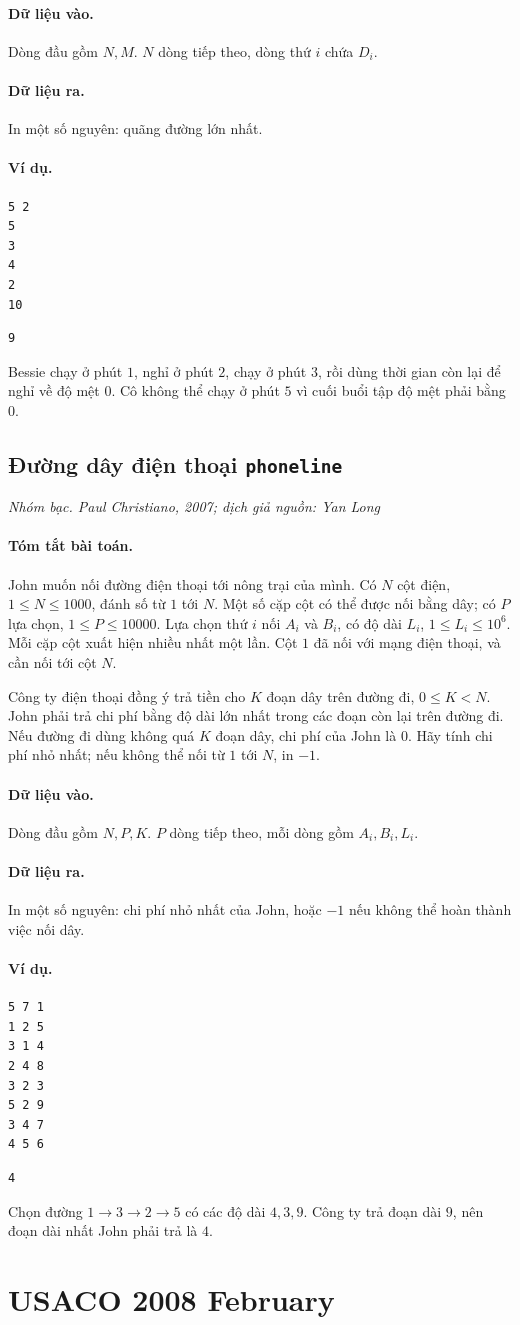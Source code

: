 \documentclass[11pt]{article}
\newcommand{\problem}[4]{%
  \subsection[#1 (#2)]{#1 \hfill {\normalsize\texttt{#2}}}%
  \noindent\textit{#3. #4}\par\smallskip
}
\newcommand{\iosec}[1]{\paragraph{#1}}
\begin{document}
\iosec{Dữ liệu vào.}
Dòng đầu gồm \(N,M\). \(N\) dòng tiếp theo, dòng thứ \(i\) chứa \(D_i\).

\iosec{Dữ liệu ra.}
In một số nguyên: quãng đường lớn nhất.

\iosec{Ví dụ.}
\begin{verbatim}
5 2
5
3
4
2
10
\end{verbatim}

\begin{verbatim}
9
\end{verbatim}

Bessie chạy ở phút \(1\), nghỉ ở phút \(2\), chạy ở phút \(3\), rồi dùng thời
gian còn lại để nghỉ về độ mệt \(0\). Cô không thể chạy ở phút \(5\) vì cuối
buổi tập độ mệt phải bằng \(0\).

\problem{Đường dây điện thoại}{phoneline}{Nhóm bạc}{Paul Christiano, 2007; dịch giả nguồn: Yan Long}

\iosec{Tóm tắt bài toán.}
John muốn nối đường điện thoại tới nông trại của mình. Có \(N\) cột điện,
\(1\le N\le 1000\), đánh số từ \(1\) tới \(N\). Một số cặp cột có thể được
nối bằng dây; có \(P\) lựa chọn, \(1\le P\le 10000\). Lựa chọn thứ \(i\)
nối \(A_i\) và \(B_i\), có độ dài \(L_i\), \(1\le L_i\le 10^6\). Mỗi cặp cột
xuất hiện nhiều nhất một lần. Cột \(1\) đã nối với mạng điện thoại, và cần
nối tới cột \(N\).

Công ty điện thoại đồng ý trả tiền cho \(K\) đoạn dây trên đường đi,
\(0\le K<N\). John phải trả chi phí bằng độ dài lớn nhất trong các đoạn còn
lại trên đường đi. Nếu đường đi dùng không quá \(K\) đoạn dây, chi phí của
John là \(0\). Hãy tính chi phí nhỏ nhất; nếu không thể nối từ \(1\) tới
\(N\), in \(-1\).

\iosec{Dữ liệu vào.}
Dòng đầu gồm \(N,P,K\). \(P\) dòng tiếp theo, mỗi dòng gồm \(A_i,B_i,L_i\).

\iosec{Dữ liệu ra.}
In một số nguyên: chi phí nhỏ nhất của John, hoặc \(-1\) nếu không thể hoàn
thành việc nối dây.

\iosec{Ví dụ.}
\begin{verbatim}
5 7 1
1 2 5
3 1 4
2 4 8
3 2 3
5 2 9
3 4 7
4 5 6
\end{verbatim}

\begin{verbatim}
4
\end{verbatim}

Chọn đường \(1\to3\to2\to5\) có các độ dài \(4,3,9\). Công ty trả đoạn dài
\(9\), nên đoạn dài nhất John phải trả là \(4\).

\section{USACO 2008 February}
\end{document}

